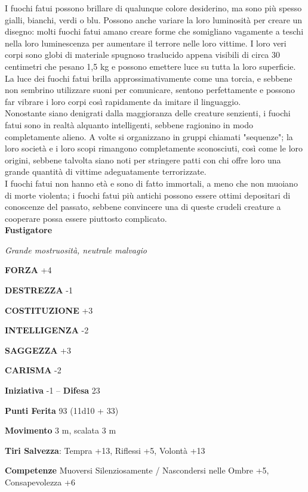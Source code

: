 \begin{multicols}{2}
I fuochi fatui possono brillare di qualunque colore desiderino, ma sono più spesso gialli, bianchi, verdi o blu. Possono anche variare la loro luminosità per creare un disegno: molti fuochi fatui amano creare forme che somigliano vagamente a teschi nella loro luminescenza per aumentare il terrore nelle loro vittime. I loro veri corpi sono globi di materiale spugnoso traslucido appena visibili di circa 30 centimetri che pesano 1,5 kg e possono emettere luce su tutta la loro superficie. La luce dei fuochi fatui brilla approssimativamente come una torcia, e sebbene non sembrino utilizzare suoni per comunicare, sentono perfettamente e possono far vibrare i loro corpi così rapidamente da imitare il linguaggio.\\

Nonostante siano denigrati dalla maggioranza delle creature senzienti, i fuochi fatui sono in realtà alquanto intelligenti, sebbene ragionino in modo completamente alieno. A volte si organizzano in gruppi chiamati "sequenze"; la loro società e i loro scopi rimangono completamente sconosciuti, così come le loro origini, sebbene talvolta siano noti per stringere patti con chi offre loro una grande quantità di vittime adeguatamente terrorizzate.\\

I fuochi fatui non hanno età e sono di fatto immortali, a meno che non muoiano di morte violenta; i fuochi fatui più antichi possono essere ottimi depositari di conoscenze del passato, sebbene convincere una di queste crudeli creature a cooperare possa essere piuttosto complicato.\\


\medskip{}\textbf{Fustigatore}

\emph{Grande mostruosità, neutrale malvagio}

\textbf{FORZA} +4

\textbf{DESTREZZA} -1

\textbf{COSTITUZIONE} +3

\textbf{INTELLIGENZA} -2

\textbf{SAGGEZZA} +3

\textbf{CARISMA} -2

\textbf{Iniziativa} -1 -- \textbf{Difesa} 23

\textbf{Punti Ferita} 93 (11d10 + 33)

\textbf{Movimento} 3 m, scalata 3 m

\textbf{Tiri Salvezza}: Tempra +13, Riflessi +5, Volontà +13

\textbf{Competenze} Muoversi Silenziosamente / Nascondersi nelle Ombre +5, Consapevolezza +6


\end{multicols}
